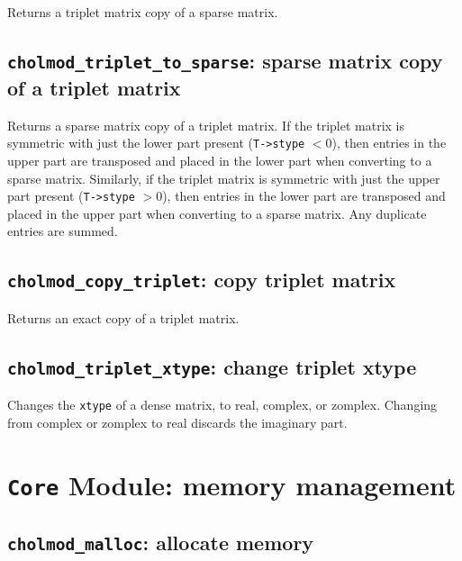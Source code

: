 \documentclass[11pt]{article}
\begin{document}

Returns a triplet matrix copy of a sparse matrix.

\subsection{{\tt cholmod\_triplet\_to\_sparse}: sparse matrix copy of a triplet matrix}


Returns a sparse matrix copy of a triplet matrix.
If the triplet matrix is symmetric with just the lower part present ({\tt T->stype} $< 0$),
then entries in the upper part are transposed and placed in the lower part when
converting to a sparse matrix.  Similarly,
if the triplet matrix is symmetric with just the upper part present ({\tt T->stype} $> 0$),
then entries in the lower part are transposed and placed in the upper part when
converting to a sparse matrix.
Any duplicate entries are summed.

\newpage \subsection{{\tt cholmod\_copy\_triplet}: copy triplet matrix}


Returns an exact copy of a triplet matrix.

\subsection{{\tt cholmod\_triplet\_xtype}: change triplet xtype}


Changes the {\tt xtype} of a dense matrix, to real, complex, or zomplex.
Changing from complex or zomplex to real discards the imaginary part.

\newpage \section{{\tt Core} Module: memory management}

\subsection{{\tt cholmod\_malloc}: allocate memory}
\end{document}
